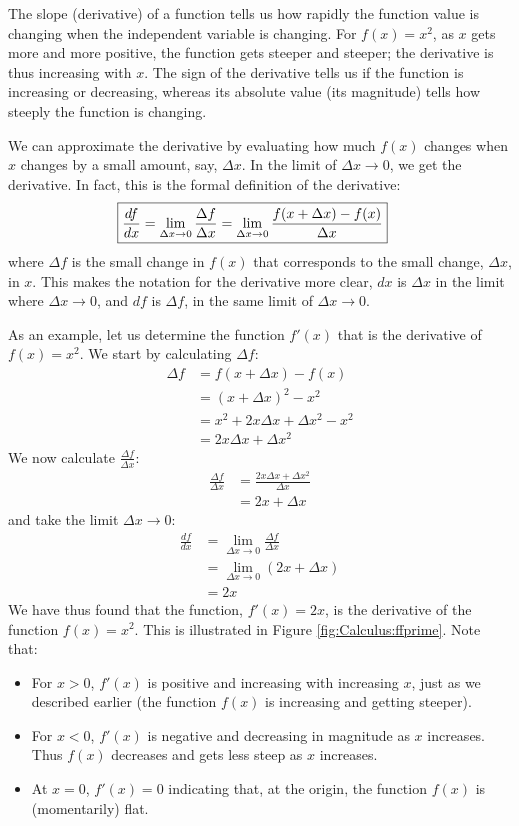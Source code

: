 The slope (derivative) of a function tells us how rapidly the function value is changing when the independent variable is changing. For $f(x)=x^2$, as $x$ gets more and more positive, the function gets steeper and steeper; the derivative is thus increasing with $x$. The sign of the derivative tells us if the function is increasing or decreasing, whereas its absolute value (its magnitude) tells how steeply the function is changing.

We can approximate the derivative by evaluating how much $f(x)$ changes when $x$ changes by a small amount, say, $\Delta x$. In the limit of $\Delta x\to 0$, we get the derivative. In fact, this is the formal definition of the derivative: 
\begin{align}
\label{eqn:Calculus:derdef}
\Aboxed{\frac{df}{dx}=\lim_{\Delta x\to 0}\frac{\Delta f}{\Delta x} =\lim_{\Delta x\to 0}\frac{f(x+\Delta x)-f(x)}{\Delta x} }
\end{align}
where $\Delta f$ is the small change in $f(x)$ that corresponds to the small change, $\Delta x$, in $x$. This makes the notation for the derivative more clear, $dx$ is $\Delta x$ in the limit where $\Delta x\to0$, and $df$ is $\Delta f$, in the same limit of $\Delta x\to 0$.

As an example, let us determine the function $f'(x)$ that is the derivative of $f(x)=x^2$. We start by calculating $\Delta f$:
\begin{align*}
\Delta f &= f(x+\Delta x)-f(x)\\
&=(x+\Delta x)^2 - x^2\\
&=x^2+2x\Delta x+\Delta x^2 -x^2\\
&=2x\Delta x+\Delta x^2
\end{align*}
We now calculate $\frac{\Delta f}{\Delta x}$:
\begin{align*}
\frac{\Delta f}{\Delta x}&=\frac{2x\Delta x+\Delta x^2}{\Delta x}\\
&=2x+\Delta x
\end{align*}
and take the limit $\Delta x\to 0$:
\begin{align*}
\frac{df}{dx}&=\lim_{\Delta x\to 0 }\frac{\Delta f}{\Delta x}\\
&=\lim_{\Delta x\to 0 }(2x+\Delta x)\\
&=2x
\end{align*}
We have thus found that the function, $f'(x)=2x$, is the derivative of the function $f(x)=x^2$. This is illustrated in Figure \ref{fig:Calculus:ffprime}. Note that:
\begin{itemize}
\item For $x>0$, $f'(x)$ is positive and increasing with increasing $x$, just as we described earlier (the function $f(x)$ is increasing and getting steeper).
\item For $x<0$, $f'(x)$ is negative and decreasing in magnitude as $x$ increases. Thus $f(x)$ decreases and gets less steep as $x$ increases.
\item At $x=0$, $f'(x)=0$ indicating that, at the origin, the function $f(x)$ is (momentarily) flat.
\end{itemize}   


